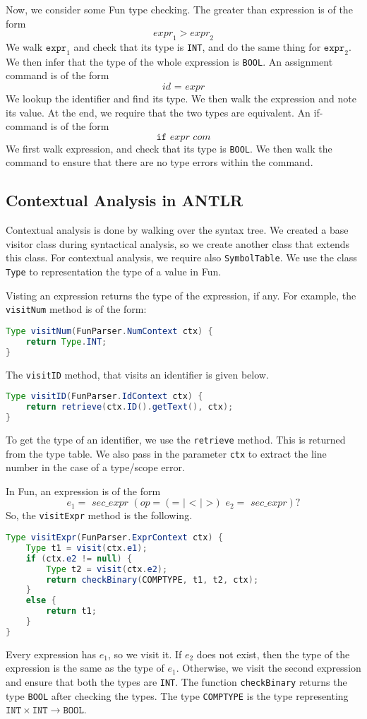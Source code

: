 \documentclass[a4paper, openany]{memoir}
\begin{document}
Now, we consider some Fun type checking. The greater than expression is of the form
\[\textit{expr}_1 > \textit{expr}_2\]
We walk $\texttt{expr}_1$ and check that its type is \texttt{INT}, and do the same thing for $\texttt{expr}_2$. We then infer that the type of the whole expression is \texttt{BOOL}. An assignment command is of the form
\[\textit{id } \texttt{=} \textit{ expr}\]
We lookup the identifier and find its type. We then walk the expression and note its value. At the end, we require that the two types are equivalent. An if-command is of the form
\[\texttt{if } \textit{expr com}\]
We first walk expression, and check that its type is \texttt{BOOL}. We then walk the command to ensure that there are no type errors within the command.

\subsection{Contextual Analysis in ANTLR}
Contextual analysis is done by walking over the syntax tree. We created a base visitor class during syntactical analysis, so we create another class that extends this class. For contextual analysis, we require also \texttt{SymbolTable}. We use the class \texttt{Type} to representation the type of a value in Fun.

Visting an expression returns the type of the expression, if any. For example, the \texttt{visitNum} method is of the form:
\begin{lstlisting}[language=java]
Type visitNum(FunParser.NumContext ctx) {
    return Type.INT;
}
\end{lstlisting}
The \texttt{visitID} method, that visits an identifier is given below.
\begin{lstlisting}[language=java]
Type visitID(FunParser.IdContext ctx) {
    return retrieve(ctx.ID().getText(), ctx);
}
\end{lstlisting}
To get the type of an identifier, we use the \texttt{retrieve} method. This is returned from the type table. We also pass in the parameter \texttt{ctx} to extract the line number in the case of a type/scope error.

In Fun, an expression is of the form
\[\textit{e}_1 = \textit{ sec\_expr } (\textit{op} = (\texttt{= }|\texttt{ < }| \texttt{ >}) \textit{ e}_2 = \textit{ sec\_expr})?\]
So, the \texttt{visitExpr} method is the following.
\begin{lstlisting}[language=java]
Type visitExpr(FunParser.ExprContext ctx) {
    Type t1 = visit(ctx.e1);
    if (ctx.e2 != null) {
        Type t2 = visit(ctx.e2);
        return checkBinary(COMPTYPE, t1, t2, ctx);
    }
    else {
        return t1;
    }
}
\end{lstlisting}
\noindent Every expression has $\textit{e}_1$, so we visit it. If $\textit{e}_2$ does not exist, then the type of the expression is the same as the type of $\textit{e}_1$. Otherwise, we visit the second expression and ensure that both the types are \texttt{INT}. The function \texttt{checkBinary} returns the type \texttt{BOOL} after checking the types. The type \texttt{COMPTYPE} is the type representing $\texttt{INT} \times \texttt{INT} \to \texttt{BOOL}$.
\end{document}
